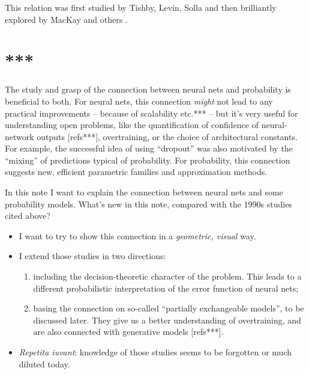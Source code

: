 \documentclass[\ifafour a4paper,12pt,\else a5paper,10pt,\fi%
onecolumn,oneside,article,%
british%
]{memoir}
\theoremstyle{remark}
\theoremstyle{innote}
\newcommand*{\citep}{\parencites}
\newcommand*{\citey}{\parencites*}
\renewcommand*{\|}{\mathpunct{|}}
\newcommand*{\etc}{{etc.}}
\begin{document}
This relation was first studied by Tishby, Levin, Solla
\citep{tishbyetal1989,levinetal1990} and then brilliantly explored by
MacKay \citey{mackay1992,mackay1992b} and others
\citey{neal1996,barberetal1998}.

\section{***}





The study and grasp of the connection between neural nets and probability
is beneficial to both. For neural nets, this connection \emph{might} not
lead to any practical improvements -- because of scalability \etc*** -- but
it's very useful for understanding open problems, like the quantification
of confidence of neural-network outputs [refs***], overtraining, or the
choice of architectural constants. For example, the successful idea of
using \enquote{dropout} was also motivated
\citep{hintonetal2012,srivastavaetal2014} by the \enquote{mixing} of
predictions typical of probability. For probability, this connection
suggests new, efficient parametric families and approximation methods.

\medskip

In this note I want to explain the connection between neural nets and some
probability models. What's new in this note, compared with the 1990s
studies cited above?
\begin{itemize}
\item I want to try to show this connection in a \emph{geometric, visual}
  way.
\item I extend those studies in two directions:
  \begin{enumerate}[label=\arabic*.]
  \item including the decision-theoretic character of the problem. This
    leads to a different probabilistic interpretation of the error function
    of neural nets;
  \item basing the connection on so-called \enquote{partially exchangeable
      models}, to be discussed later. They give us a better understanding
    of overtraining, and are also connected with generative models
    [refs***].
  \end{enumerate}
\item\emph{Repetita iuvant}: knowledge of those studies seems to be
  forgotten or much diluted today.
\end{itemize}
\end{document}
